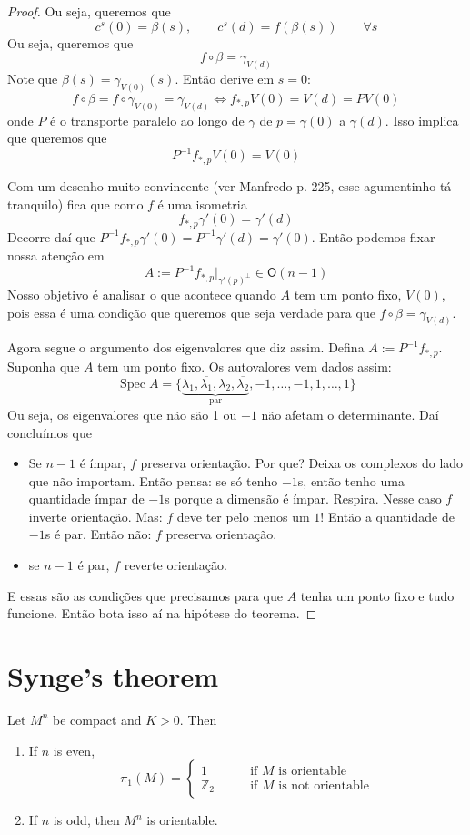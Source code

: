 \begin{proof}
Ou seja, queremos que
$$
c^s(0)=\beta(s),\qquad c^s(d)=f(\beta(s))\qquad \forall s
$$
Ou seja, queremos que
$$
f \circ \beta=\gamma_{V(d)}
$$
Note que $\beta(s)=\gamma_{V(0)}(s)$. Então derive em $s=0$: \[f \circ
\beta=f\circ\gamma_{V(0)}=\gamma_{V(d)}\iff f_{*,p}V(0)=V(d)=PV(0)\] onde $P$ é
o transporte paralelo ao longo de $\gamma$ de $p=\gamma(0)$ a $\gamma(d)$.  Isso
implica que queremos que \[P^{-1}f_{*,p}V(0)=V(0)\]

Com um desenho muito convincente (ver Manfredo p. 225, esse agumentinho tá
tranquilo) fica que como $f$ é uma isometria \[f_{*,p}\gamma'(0)=\gamma'(d)\]
Decorre daí que $P^{-1}f_{*,p}\gamma'(0)=P^{-1}\gamma'(d)=\gamma'(0)$. Então
podemos fixar nossa atenção em
$$
A:=P^{-1}f_{*,p}|_{\gamma'(p)^\perp}\in \mathsf{O}(n-1)
$$
Nosso objetivo é analisar o que acontece quando $A$ tem um ponto fixo, $V(0)$,
pois essa é uma condição que queremos que seja verdade para que $f\circ \beta =
\gamma_{V(d)}$.

Agora segue o argumento dos eigenvalores que diz assim. Defina
$A:=P^{-1}f_{*,p}$. Suponha que $A$ tem um ponto fixo. Os autovalores vem dados
assim:
$$
\operatorname{Spec}A=\{\underbrace{\lambda_1,\overline{\lambda_1},\lambda_2,\overline{\lambda_2}}_{\text{par} },-1,\ldots,-1,1,\ldots,1\}
$$
Ou seja, os eigenvalores que não são 1 ou $-1$ não afetam o determinante. Daí
concluímos que
\begin{itemize}
\item Se $n-1$ é ímpar, $f$ preserva orientação. Por que? Deixa os complexos do
lado que não importam. Então pensa: se só tenho $-1$s, então tenho uma
quantidade ímpar de $-1$s porque a dimensão é ímpar. Respira. Nesse caso $f$
inverte orientação. Mas: $f$ deve ter pelo menos um $1$! Então a quantidade de
$-1$s  é par. Então não: $f$ preserva orientação.
\item se $n-1$ é par, $f$ reverte orientação.
\end{itemize}
E essas são as condições que precisamos para que $A$ tenha um ponto fixo e tudo
funcione. Então bota isso aí na hipótese do teorema.
\end{proof}

\section{Synge's theorem}
\label{section-Synge-theorem}

\begin{theorem}[Synge]
\label{theorem-Synge}
Let $M^n$ be compact and $K>0$. Then
\begin{enumerate}
\item If $n$ is even,
$$
\pi_1(M)=\begin{cases}
	1\qquad & \text{if $M$ is orientable}\\
	\mathbb{Z}_2\qquad & \text{if $M$ is not orientable}
\end{cases}
$$
\item If $n$ is odd, then $M^n$ is orientable.
\end{enumerate}
\end{theorem}

